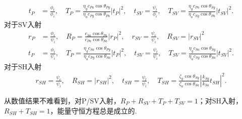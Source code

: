 \begin{exbox}
\begin{align*}
		t_P &= \frac{\phi_t}{\phi_i}, \quad T_P = \frac{\eta_g c_{Pa} \cos\theta_{Pg}}{\eta_a c_{Pg} \cos\theta_{Pa}} \left| t_P \right|^2, \quad t_{SV} = \frac{\psi_t}{\phi_i}, \quad T_{SV} = \frac{\eta_g c_{Pa} \cos\theta_{Sg}}{\eta_a c_{Sg} \cos\theta_{Pa}} \left| t_{SV} \right|^2.
	\end{align*}
	对于SV入射
	\begin{align*}
		r_P &= \frac{\phi_r}{\psi_i}, \quad R_P = \frac{c_{Sa} \cos\theta_{Pa}}{c_{Pa} \cos\theta_{Sa}} \left| r_P \right|^2, \quad r_{SV} = \frac{\psi_r}{\psi_i}, \quad R_{SV} = \left| r_{SV} \right|^2\\
		t_P &= \frac{\phi_t}{\psi_i}, \quad T_P = \frac{\eta_g c_{Sa} \cos\theta_{Pg}}{\eta_a c_{Pg} \cos\theta_{Sa}} \left| t_P \right|^2, \quad t_{SV} = \frac{\psi_t}{\psi_i}, \quad T_{SV} = \frac{\eta_g c_{Sa} \cos\theta_{Sg}}{\eta_a c_{Sg} \cos\theta_{Sa}} \left| t_{SV} \right|^2.
	\end{align*}
	对于SH入射
	\begin{align*}
		r_{SH} = \frac{\psi_r}{\psi_i}, \quad R_{SH} = \left| r_{SH} \right|^2, \quad t_{SH} = \frac{\psi_t}{\psi_i}, \quad T_{SH} = \frac{\zeta_g \cos\theta_{Sg}}{\zeta_a \cos\theta_{Sa}} \left| \frac{k_{Sg}}{k_{Sa}} t_{SH} \right|^2.
	\end{align*}

	从数值结果不难看到，对P/SV入射，\(R_P + R_{SV} + T_P + T_{SV} = 1\)；对SH入射，\(R_{SH} + T_{SH} = 1\)，能量守恒方程总是成立的.
\end{exbox}

